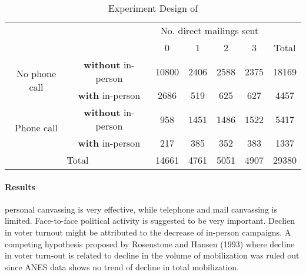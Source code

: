 \documentclass[twoside]{article}
\theoremstyle{definition}
\begin{document}
\begin{table}[ht]
\caption{Experiment Design of \citet{gerber2000effects}}\label{tab:gerber2000design}
\centering
    \begin{tabular}{ccccccc}
             & & \multicolumn{4}{c}{No. direct mailings sent} & \\ \cline{3-6}
            & & 0 & 1 & 2 & 3 & Total\\ 
        \hline
        \multirow{2}{*}{No phone call} & \textbf{without} in-person &  10800 & 2406 & 2588 & 2375 & 18169 \\
         & \textbf{with} in-person & 2686 & 519 & 625 & 627 & 4457\\
         \multirow{2}{*}{Phone call} & \textbf{without} in-person &  958 & 1451 & 1486 & 1522 & 5417 \\
         & \textbf{with} in-person & 217 & 385 & 352 & 383 & 1337\\
        \hline
        \multicolumn{2}{c}{Total} & 14661 & 4761 & 5051 & 4907 & 29380\\
    \end{tabular}
\end{table}

\paragraph*{Results} personal canvassing is very effective, while telephone and mail canvassing is limited. Face-to-face political activity is suggested to be very important. Declien in voter turnout might be attributed to the decrease of in-person campaigns. A competing hypothesis proposed by Rosenstone and Hansen (1993) where decline in voter turn-out is related to decline in the volume of mobilization was ruled out since ANES data shows no trend of decline in total mobilization.
\end{document}

